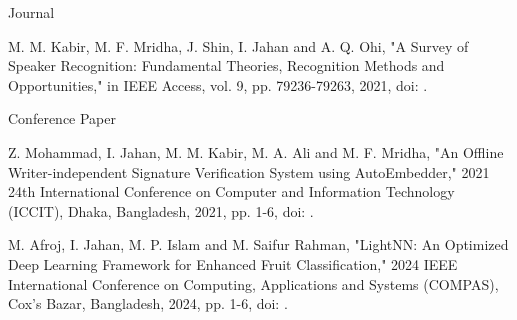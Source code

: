 

\begin{cventries}

  \cventry
    {} %
    {Journal} %
    {} %
    {} %
    {
      \begin{cvitems} %
        \item {
        M. M. Kabir, M. F. Mridha, J. Shin, I. Jahan and A. Q. Ohi, "A Survey of Speaker Recognition: Fundamental Theories, Recognition Methods and Opportunities," in IEEE Access, vol. 9, pp. 79236-79263, 2021, doi: {}
        .}
      \end{cvitems}
    }

  \cventry
    {} %
    {Conference Paper} %
    {} %
    {} %
    {
      \begin{cvitems} %
        \item {
        Z. Mohammad, I. Jahan, M. M. Kabir, M. A. Ali and M. F. Mridha, "An Offline Writer-independent Signature Verification System using AutoEmbedder," 2021 24th International Conference on Computer and Information Technology (ICCIT), Dhaka, Bangladesh, 2021, pp. 1-6, doi: {}.
        \vspace{2mm}}
        \item {
        M. Afroj, I. Jahan, M. P. Islam and M. Saifur Rahman, "LightNN: An Optimized Deep Learning Framework for Enhanced Fruit Classification," 2024 IEEE International Conference on Computing, Applications and Systems (COMPAS), Cox's Bazar, Bangladesh, 2024, pp. 1-6, doi: {}.
        }
      \end{cvitems}
    }

\end{cventries}
